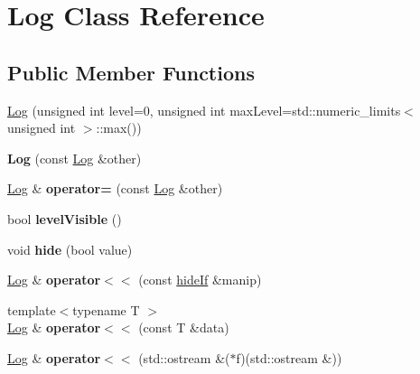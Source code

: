 \hypertarget{classLog}{}\section{Log Class Reference}
\label{classLog}
\subsection*{Public Member Functions}
\begin{DoxyCompactItemize}
\item 
\mbox{\hyperlink{classLog_a56dcaa4d61eeb8f1944e2332c6b98572}{Log}} (unsigned int level=0, unsigned int max\+Level=std\+::numeric\+\_\+limits$<$ unsigned int $>$\+::max())
\item 
\mbox{\label{classLog_ace157a0c5260c9f5eddbe42e4358408b}} 
{\bfseries Log} (const \mbox{\hyperlink{classLog}{Log}} \&other)
\item 
\mbox{\label{classLog_ac2a5dd89bddfec96e41228add16e9f3e}} 
\mbox{\hyperlink{classLog}{Log}} \& {\bfseries operator=} (const \mbox{\hyperlink{classLog}{Log}} \&other)
\item 
\mbox{\label{classLog_a6cdf57285259ca358e417b6280d54c4b}} 
bool {\bfseries level\+Visible} ()
\item 
\mbox{\label{classLog_a0459b70fb34caf067d4efb6a2f7f22b3}} 
void {\bfseries hide} (bool value)
\item 
\mbox{\label{classLog_ad7d1859b5a208632ef815387c9f9bd5d}} 
\mbox{\hyperlink{classLog}{Log}} \& {\bfseries operator$<$$<$} (const \mbox{\hyperlink{structhideIf}{hide\+If}} \&manip)
\item 
\mbox{\label{classLog_a24827d2bf5de1e0419cfa17960999da6}} 
{\footnotesize template$<$typename T $>$ }\\\mbox{\hyperlink{classLog}{Log}} \& {\bfseries operator$<$$<$} (const T \&data)
\item 
\mbox{\label{classLog_a0ebba742607bb64c95776730bba7aeba}} 
\mbox{\hyperlink{classLog}{Log}} \& {\bfseries operator$<$$<$} (std\+::ostream \&($\ast$f)(std\+::ostream \&))
\end{DoxyCompactItemize}
